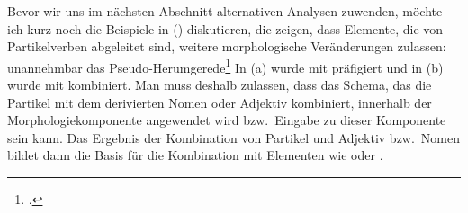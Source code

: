 \noindent
Bevor wir uns im nächsten Abschnitt alternativen Analysen zuwenden, möchte
ich kurz noch die Beispiele in () diskutieren, die zeigen, dass Elemente, die von Partikelverben
abgeleitet sind, weitere morphologische Veränderungen zulassen:
\eal
\label{pvs-in-morphology}
\ex 
unannehmbar
\ex 
das Pseudo-Herumgerede\footnote{
        .%
    }
\zl
In (a) wurde  mit  präfigiert und in (b) wurde
 mit  kombiniert. Man muss deshalb zulassen,
dass das Schema, das die Partikel mit dem derivierten Nomen oder Adjektiv kombiniert,
innerhalb der Morphologiekomponente angewendet wird bzw.\ Eingabe zu dieser Komponente sein
kann. 
Das Ergebnis der
Kombination von Partikel und Adjektiv bzw.\ Nomen 
bildet dann die Basis für die
Kombination mit Elementen wie  oder .

%
%






